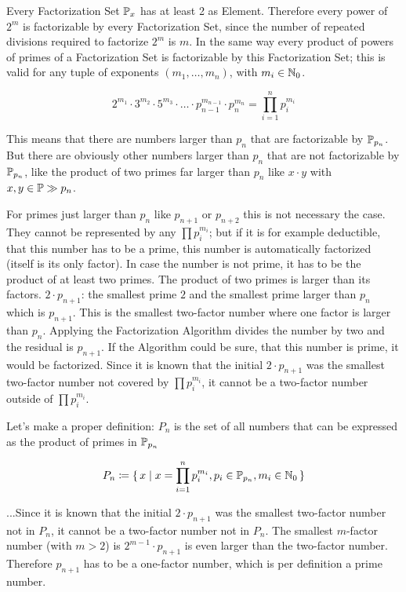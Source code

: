 \documentclass[a4paper,10pt]{article}
\begin{document}

Every Factorization Set $\mathbb{P}_x$ has at least 2 as Element.
Therefore every power of $2^m$ is factorizable by every Factorization Set,
since the number of repeated divisions required to factorize $2^m$ is $m$.
In the same way every product of powers of primes of a Factorization Set
is factorizable by this Factorization Set;
this is valid for any tuple of exponents $(m_1, \dots, m_n)$, with $m_i \in \mathbb{N}_0$.

$$2^{m_1} \cdot 3^{m_2} \cdot 5^{m_3} \cdot \ldots \cdot p_{n-1}^{m_{n-1}} \cdot p_n^{m_n}
= \prod_{i=1}^n p_i^{m_i} $$

This means that there are numbers larger than $p_n$ that are factorizable by $\mathbb{P}_{p_n}$.
But there are obviously other numbers larger than $p_n$ that are not factorizable by $\mathbb{P}_{p_n}$,
like the product of two primes far larger than $p_n$ like $x \cdot y$ with $x,y \in \mathbb{P} \gg p_n$.

For primes just larger than $p_n$ like $p_{n+1}$ or $p_{n+2}$ this is not necessary the case.
They cannot be represented by any $\prod p_i^{m_i}$;
but if it is for example deductible, that this number has to be a prime,
this number is automatically factorized (itself is its only factor).
In case the number is not prime, it has to be the product of at least two primes.
The product of two primes is larger than its factors.
$2 \cdot p_{n+1}$:
the smallest prime $2$ and the smallest prime larger than $p_n$ which is $p_{n+1}$.
This is the smallest two-factor number where one factor is larger than $p_n$.
Applying the Factorization Algorithm divides the number by two and the residual is $p_{n+1}$.
If the Algorithm could be sure, that this number is prime, it would be factorized.
Since it is known that the initial $2 \cdot p_{n+1}$ was the smallest two-factor number
not covered by $\prod p_i^{m_i}$, it cannot be a two-factor number outside of $\prod p_i^{m_i}$.

Let's make a proper definition:
$P_n$ is the set of all numbers that can be expressed as the product of primes in $\mathbb{P}_{p_n}$

$$ P_n \coloneq \lbrace \, { {x} \;|\; {x = \prod_{i=1}^n p_i^{m_i}, p_i \in \mathbb{P}_{p_n}, m_i \in \mathbb{N}_0 } } \, \rbrace$$

...Since it is known that the initial $2 \cdot p_{n+1}$ was the smallest two-factor number
not in $P_n$, it cannot be a two-factor number not in  $P_n$.
The smallest $m$-factor number (with $m > 2$) is $2^{m-1} \cdot p_{n+1}$ is even larger than
the two-factor number.
Therefore $p_{n+1}$ has to be a one-factor number, which is per definition a prime number.
\end{document}
